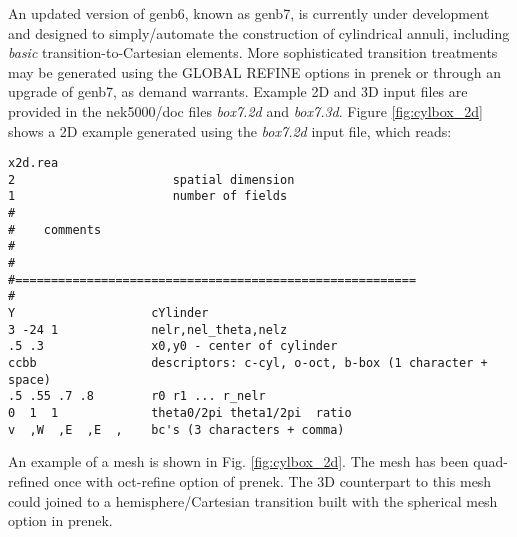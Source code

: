 An updated version of genb6, known as genb7, is currently under development
and designed to simply/automate the construction of cylindrical annuli, 
including {\em basic} transition-to-Cartesian elements.   More sophisticated
transition treatments may be generated using the GLOBAL REFINE options in
prenek or through an upgrade of genb7, as demand warrants.
Example 2D and 3D input files are provided in the nek5000/doc files
{\em box7.2d} and {\em box7.3d}.
Figure \ref{fig:cylbox_2d} shows a 2D example generated using 
the {\em box7.2d} input file, which reads:
\begin{verbatim}
x2d.rea
2                      spatial dimension
1                      number of fields
#
#    comments
#
#
#========================================================
#
Y                   cYlinder
3 -24 1             nelr,nel_theta,nelz
.5 .3               x0,y0 - center of cylinder
ccbb                descriptors: c-cyl, o-oct, b-box (1 character + space)
.5 .55 .7 .8        r0 r1 ... r_nelr
0  1  1             theta0/2pi theta1/2pi  ratio 
v  ,W  ,E  ,E  ,    bc's (3 characters + comma)
\end{verbatim}

\noindent
An example of a mesh is shown in Fig. \ref{fig:cylbox_2d}.   The mesh has been quad-refined
once with oct-refine option of prenek. The 3D counterpart to this 
mesh could joined to a hemisphere/Cartesian transition built with
the spherical mesh option in prenek. 
